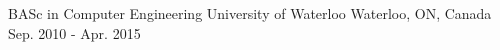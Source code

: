 

\begin{cventries}

  \cventry
    {BASc in Computer Engineering} %
    {University of Waterloo} %
    {Waterloo, ON, Canada} %
    {Sep. 2010 - Apr. 2015} %
    {
    }

\end{cventries}
